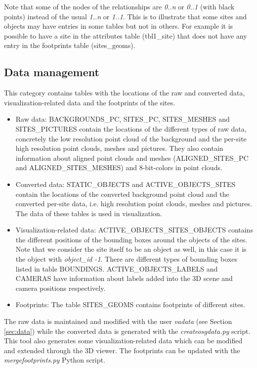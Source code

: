 \documentclass[a4paper,11pt]{article}
\begin{document}
Note that some of the nodes of the relationships are \textit{0..n} or \textit{0..1} (with black points) instead of the usual \textit{1..n} or \textit{1..1}. This is to illustrate that some sites and objects may have entries in some tables but not in others. For example it is possible to have a site in the attributes table (tbl1\_site) that does not have any entry in the footprints table (sites\_geoms).

\subsection{Data management}

This category contains tables with the locations of the raw and converted data, visualization-related data and the footprints of the sites.

\begin{itemize}
\item Raw data: BACKGROUNDS\_PC, SITES\_PC, SITES\_MESHES and SITES\_PICTURES contain the locations of the different types of raw data, concretely the low resolution point cloud of the background and the per-site high resolution point clouds, meshes and pictures. They also contain information about aligned point clouds and meshes (ALIGNED\_SITES\_PC and ALIGNED\_SITES\_MESHES) and 8-bit-colors in point clouds.

\item Converted data: STATIC\_OBJECTS and ACTIVE\_OBJECTS\_SITES contain the locations of the converted background point cloud and the converted per-site data, i.e. high resolution point clouds, meshes and pictures. The data of these tables is used in visualization.

\item Visualization-related data: ACTIVE\_OBJECTS\_SITES\_OBJECTS contains the different positions of the bounding boxes around the objects of the sites. Note that we consider the site itself to be an object as well, in this case it is the object with \textit{object\_id -1}. There are different types of bounding boxes listed in table BOUNDINGS. ACTIVE\_OBJECTS\_LABELS and CAMERAS have information about labels added into the 3D scene and camera positions respectively.

\item Footprints: The table SITES\_GEOMS contains footprints of different sites.
\end{itemize}

The raw data is maintained and modified with the user \textit{vadata} (see Section \ref{sec:data}) while the converted data is generated with the \textit{createosgdata.py} script. This tool also generates some visualization-related data which can be modified and extended through the 3D viewer. The footprints can be updated with the \textit{mergefootprints.py} Python script.
\end{document}
